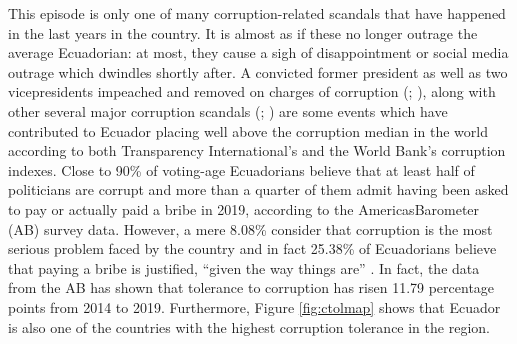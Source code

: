\documentclass[floatsintext,man]{apa7}\usepackage[]{graphicx}\usepackage[]{color}
\begin{document}
This episode is only one of many corruption-related scandals that have happened in the last years in the country. It is almost as if these no longer outrage the average Ecuadorian: at most, they cause a sigh of disappointment or social media outrage which dwindles shortly after. A convicted former president as well as two vicepresidents impeached and removed on charges of corruption (\cite{Press.1222018}; \cite{Cabrera.2020}), along with other several major corruption scandals (\cite{BHCompliance.2021}; \cite{Espana.2020}) are some events which have contributed to Ecuador placing well above the corruption median in the world according to both Transparency International's and the World Bank's corruption indexes. Close to 90\% of voting-age Ecuadorians believe that at least half of politicians are corrupt and more than a quarter of them admit having been asked to pay or actually paid a bribe in 2019, according to the AmericasBarometer (AB) survey data. However, a mere 8.08\% consider that corruption is the most serious problem faced by the country and in fact 25.38\% of Ecuadorians believe that paying a bribe is justified, \enquote{given the way things are} \parencite[p. 96]{Moscoso.2018}. In fact, the data from the AB has shown that tolerance to corruption has risen 11.79 percentage points from 2014 to 2019. Furthermore, Figure \ref{fig:ctolmap} shows that Ecuador is also one of the countries with the highest corruption tolerance in the region.
\end{document}
